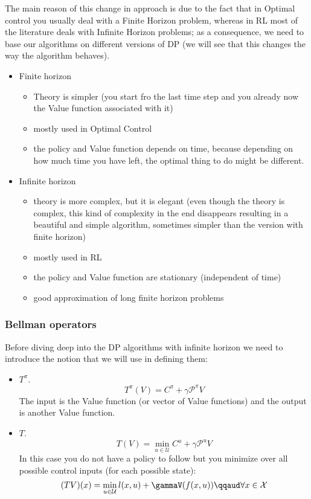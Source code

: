 The main reason of this change in approach is due to the fact that in Optimal control you usually deal with a Finite Horizon problem, whereas in RL most of the literature deals with Infinite Horizon problems; as a consequence, we need to base our algorithms on different versions of DP (we will see that this changes the way the algorithm behaves).

\begin{itemize}
\item Finite horizon
\begin{itemize}
\item Theory is simpler (you start fro the last time step and you already now the Value function associated with it)
\item mostly used in Optimal Control
\item the policy and Value function depends on time, because depending on how much time you have left, the optimal thing to do might be different.
\end{itemize}
\item Infinite horizon
\begin{itemize}
\item theory is more complex, but it is elegant (even though the theory is complex, this kind of complexity in the end disappears resulting in a beautiful and simple algorithm, sometimes simpler than the version with finite horizon)
\item mostly used in RL
\item the policy and Value function are stationary (independent of time)
\item good approximation of long finite horizon problems
\end{itemize}
\end{itemize}

\subsubsection{Bellman operators}
Before diving deep into the DP algorithms with infinite horizon we need to introduce the notion that we will use in defining them:
\begin{itemize}
\item {} $T^{\pi}$.
\[T^{\pi}(V) = C^{\pi} + \gamma\mathcal{P}^{\pi}V\]
The input is the Value function (or vector of Value functions) and the output is another Value function.
\item {} $T$.
\[T(V) = \min_{u\in\mathcal{U}} C^u + \gamma\mathcal{P}^uV\]
In this case you do not have a policy to follow but you minimize over all possible control inputs (for each possible state):
\[(TV)(x) = \min_{u\in\mathcal{U}} l(x,u) + \gammaV(f(x,u))\qqaud\forall x \in \mathcal{X}\]
\end{itemize}

